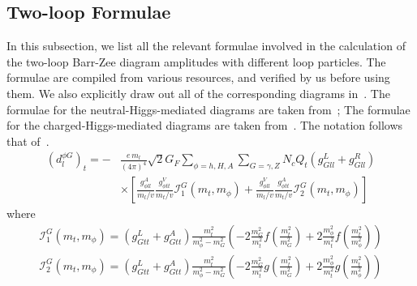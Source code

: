 \subsection{Two-loop Formulae}
In this subsection, we list all the relevant formulae involved in the calculation of the two-loop Barr-Zee diagram amplitudes with different loop particles.
The formulae are compiled from various resources, and verified by us before using them.
We also explicitly draw out all of the corresponding diagrams in~.
The formulae for the neutral-Higgs-mediated diagrams are taken from~\cite{Abe2016EDM};
The formulae for the charged-Higgs-mediated diagrams are taken from~\cite{BowserChao1997EDM}.
The notation follows that of~\cite{Abe2016EDM}.
\begin{align}\label{eq:BarrZee-phiG-toploop}
	(d^{\phi G}_{l})_{t} = -&\frac{e\,m_{l}}{(4\pi)^{4}}\sqrt{2}G_{F}\sum_{\phi=h,H,A}\sum_{G=\gamma,Z}N_{c}Q_{t}(g_{Gll}^{L}+g_{Gll}^{R}) \nonumber \\
	& \times \left[\frac{g_{\phi ll}^{A}}{m_{l}/v}\frac{g_{\phi tt}^{V}}{m_{t}/v}\mathcal{I}_{1}^{G}(m_{t}, m_{\phi}) + \frac{g_{\phi ll}^{V}}{m_{l}/v}\frac{g_{\phi tt}^{A}}{m_{t}/v}\mathcal{I}_{2}^{G}(m_{t}, m_{\phi})\right]
\end{align}
where
\begin{align}
	\mathcal{I}_{1}^{G}(m_{t},m_{\phi}) = (g_{Gtt}^{L}+g_{Gtt}^{A})\frac{m_{t}^{2}}{m_{\phi}^{2}-m_{G}^{2}}
	\left(-2\frac{m_{G}^{2}}{m_{t}^{2}} f\left(\frac{m_{t}^{2}}{m_{G}^{2}}\right) + 2\frac{m_{\phi}^{2}}{m_{t}^{2}} f\left(\frac{m_{t}^{2}}{m_{\phi}^{2}}\right)\right) \nonumber \\
	\mathcal{I}_{2}^{G}(m_{t},m_{\phi}) = (g_{Gtt}^{L}+g_{Gtt}^{A})\frac{m_{t}^{2}}{m_{\phi}^{2}-m_{G}^{2}}
	\left(-2\frac{m_{G}^{2}}{m_{t}^{2}} g\left(\frac{m_{t}^{2}}{m_{G}^{2}}\right) + 2\frac{m_{\phi}^{2}}{m_{t}^{2}} g\left(\frac{m_{t}^{2}}{m_{\phi}^{2}}\right)\right)
\end{align}

